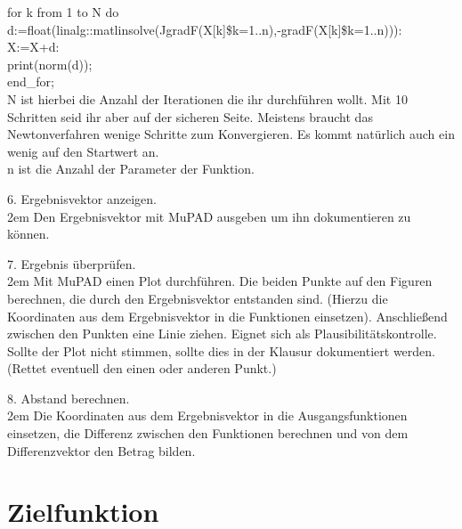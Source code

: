 \documentclass[11pt,final]{scrreprt}
\begin{document}
for k from 1 to N do\\
\hspace*{2em}d:=float(linalg::matlinsolve(JgradF(X[k]\$k=1..n),-gradF(X[k]\$k=1..n))):\\
\hspace*{2em}X:=X+d:\\
\hspace*{2em}print(norm(d));\\
end\_for;\\

N ist hierbei die Anzahl der Iterationen die ihr durchführen wollt. Mit 10 Schritten seid ihr aber auf der sicheren Seite. Meistens braucht das Newtonverfahren wenige Schritte zum Konvergieren. Es kommt natürlich auch ein wenig auf den Startwert an.\\
n ist die Anzahl der Parameter der Funktion.\\

\par	
\endgroup

6. Ergebnisvektor anzeigen.\\

\begingroup
\leftskip2em 
Den Ergebnisvektor mit MuPAD ausgeben um ihn dokumentieren zu können.\\
\par	
\endgroup

7. Ergebnis überprüfen.\\

\begingroup
\leftskip2em 
Mit MuPAD einen Plot durchführen. Die beiden Punkte auf den Figuren berechnen, die durch den Ergebnisvektor entstanden sind. (Hierzu die Koordinaten aus dem Ergebnisvektor in die Funktionen einsetzen). Anschließend zwischen den Punkten eine Linie ziehen. Eignet sich als Plausibilitätskontrolle. Sollte der Plot nicht stimmen, sollte dies in der Klausur dokumentiert werden. (Rettet eventuell den einen oder anderen Punkt.)\\
\par	
\endgroup

8. Abstand berechnen.\\

\begingroup
\leftskip2em 
Die Koordinaten aus dem Ergebnisvektor in die Ausgangsfunktionen einsetzen, die Differenz zwischen den Funktionen berechnen und von dem Differenzvektor den Betrag bilden.\\
\par	
\endgroup

\newpage
\section{Zielfunktion}
\end{document}
